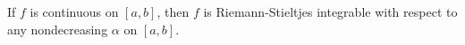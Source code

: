 If $f$ is continuous on $[a, b]$, then $f$ is Riemann-Stieltjes integrable with respect to any nondecreasing $\alpha$ on $[a, b]$.
